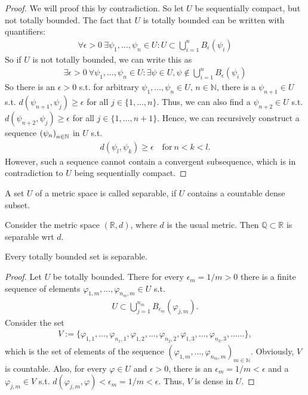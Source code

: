 \begin{proof}
	We will proof this by contradiction. So let $U$ be sequentially compact, but not totally bounded. The fact that $U$ is totally bounded can be written with quantifiers:
	\begin{align*}
		\forall \epsilon > 0\ \exists \psi_1, \dots, \psi_n\in U: U\subset \bigcup_{i=1}^{n}B_{\epsilon}(\psi_i)
	\end{align*}
	So if $U$ is not totally bounded, we can write this as 
	\begin{align*}
		\exists\epsilon > 0\ \forall \psi_1, \dots, \psi_n\in U:\exists \psi\in U, \psi\notin\bigcup_{i = 1}^{n}B_{\epsilon}(\psi_i)
	\end{align*}		
	So there is an $\epsilon > 0$ s.t. for arbitrary $\psi_1, \dots, \psi_n\in U$, $n\in\mathbb N$, there is a $\psi_{n+1}\in U$ s.t. $d(\psi_{n+1}, \psi_j) \geq \epsilon$ for all $j\in\{1, \dots, n\}$. Thus, we can also find a $\psi_{n+2}\in U$ s.t. $d(\psi_{n+2}, \psi_j) \geq \epsilon$ for all $j\in \{1, \dots, n+1\}$. Hence, we can recursively construct a sequence $\seq[\psi_n]$ in $U$ s.t.
	\begin{align*}
		d(\psi_l, \psi_k) \geq\epsilon\quad \text{for}\ n < k < l.
	\end{align*}
	However, such a sequence cannot contain a convergent subsequence, which is in contradiction to $U$ being sequentially compact.
\end{proof}

\begin{defn}
	A set $U$ of a metric space is called separable, if $U$ contains a countable dense subset.
\end{defn}

\begin{exmp}
	Consider the metric space $(\mathbb R, d)$, where $d$ is the usual metric. Then $\mathbb Q\subset\mathbb R$ is separable wrt $d$.
\end{exmp}

\begin{theorem}
	Every totally bounded set is separable.
\end{theorem}

\begin{proof}
	Let $U$ be totally bounded. There for every $\epsilon_{m} = 1/m > 0$ there is a finite sequence of elements $\varphi_{1, m}, \dots, \varphi_{n_m, m}\in U$ s.t.
	\begin{align*}
		U \subset \bigcup_{j = 1}^{n_m}B_{\epsilon_m}(\varphi_{j, m}).
	\end{align*}
	Consider the set
	\begin{align*}
		V := \{\varphi_{1, 1}, \dots, \varphi_{n_1, 1}, \varphi_{1, 2}, \dots, \varphi_{n_2, 2}, \varphi_{1, 3}, \dots, \varphi_{n_3, 3}, \dots \dots\},
	\end{align*}
	which is the set of elements of the sequence $\left(\varphi_{1, m}, \dots, \varphi_{n_m, m}\right)_{m\in\mathbb N}$. Obviously, $V$ is countable. Also, for every $\varphi\in U$ and $\epsilon > 0$, there is an $\epsilon_m = 1/m < \epsilon$ and a $\varphi_{j, m}\in V$ s.t. $d(\varphi_{j, m}, \varphi) < \epsilon_m = 1/m < \epsilon$. Thus, $V$ is dense in $U$.
\end{proof}

